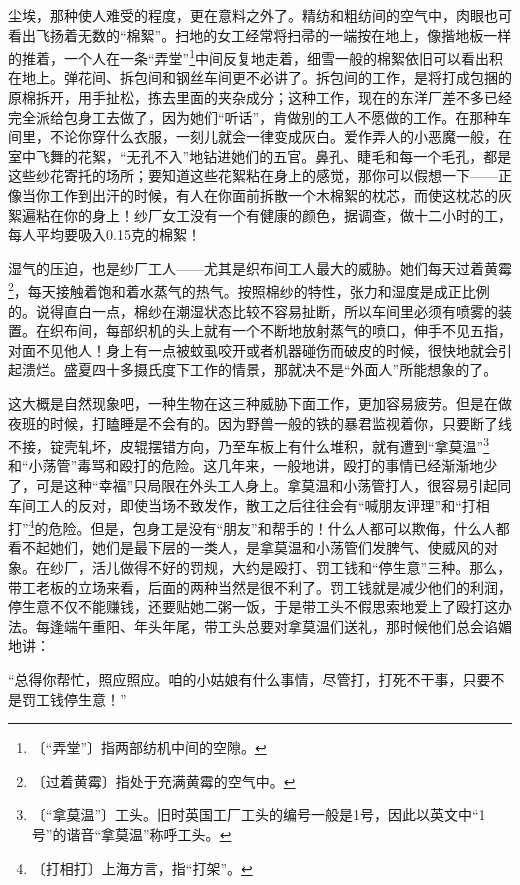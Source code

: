 \documentclass[12pt,UTF-8,openany]{ctexbook}
\begin{document}
\begin{large}
    尘埃，那种使人难受的程度，更在意料之外了。精纺和粗纺间的空气中，肉眼也可看出飞扬着无数的“棉絮”。扫地的女工经常将扫帚的一端按在地上，像揩地板一样的推着，一个人在一条“弄堂”\footnote{〔“弄堂”〕指两部纺机中间的空隙。}中间反复地走着，细雪一般的棉絮依旧可以看出积在地上。弹花间、拆包间和钢丝车间更不必讲了。拆包间的工作，是将打成包捆的原棉拆开，用手扯松，拣去里面的夹杂成分；这种工作，现在的东洋厂差不多已经完全派给包身工去做了，因为她们“听话”，肯做别的工人不愿做的工作。在那种车间里，不论你穿什么衣服，一刻儿就会一律变成灰白。爱作弄人的小恶魔一般，在室中飞舞的花絮，“无孔不入”地钻进她们的五官。鼻孔、睫毛和每一个毛孔，都是这些纱花寄托的场所；要知道这些花絮粘在身上的感觉，那你可以假想一下——正像当你工作到出汗的时候，有人在你面前拆散一个木棉絮的枕芯，而使这枕芯的灰絮遍粘在你的身上！纱厂女工没有一个有健康的颜色，据调查，做十二小时的工，每人平均要吸入0.15克的棉絮！
    
    湿气的压迫，也是纱厂工人——尤其是织布间工人最大的威胁。她们每天过着黄霉\footnote{〔过着黄霉〕指处于充满黄霉的空气中。}，每天接触着饱和着水蒸气的热气。按照棉纱的特性，张力和湿度是成正比例的。说得直白一点，棉纱在潮湿状态比较不容易扯断，所以车间里必须有喷雾的装置。在织布间，每部织机的头上就有一个不断地放射蒸气的喷口，伸手不见五指，对面不见他人！身上有一点被蚊虱咬开或者机器碰伤而破皮的时候，很快地就会引起溃烂。盛夏四十多摄氏度下工作的情景，那就决不是“外面人”所能想象的了。
    
    这大概是自然现象吧，一种生物在这三种威胁下面工作，更加容易疲劳。但是在做夜班的时候，打瞌睡是不会有的。因为野兽一般的铁的暴君监视着你，只要断了线不接，锭壳轧坏，皮辊摆错方向，乃至车板上有什么堆积，就有遭到“拿莫温”\footnote{〔“拿莫温”〕工头。旧时英国工厂工头的编号一般是1号，因此以英文中“1号”的谐音“拿莫温”称呼工头。}和“小荡管”毒骂和殴打的危险。这几年来，一般地讲，殴打的事情已经渐渐地少了，可是这种“幸福”只局限在外头工人身上。拿莫温和小荡管打人，很容易引起同车间工人的反对，即使当场不致发作，散工之后往往会有“喊朋友评理”和“打相打”\footnote{〔打相打〕上海方言，指“打架”。}的危险。但是，包身工是没有“朋友”和帮手的！什么人都可以欺侮，什么人都看不起她们，她们是最下层的一类人，是拿莫温和小荡管们发脾气、使威风的对象。在纱厂，活儿做得不好的罚规，大约是殴打、罚工钱和“停生意”三种。那么，带工老板的立场来看，后面的两种当然是很不利了。罚工钱就是减少他们的利润，停生意不仅不能赚钱，还要贴她二粥一饭，于是带工头不假思索地爱上了殴打这办法。每逢端午重阳、年头年尾，带工头总要对拿莫温们送礼，那时候他们总会谄媚地讲：
    
    “总得你帮忙，照应照应。咱的小姑娘有什么事情，尽管打，打死不干事，只要不是罚工钱停生意！”
    

\end{large}
\end{document}
